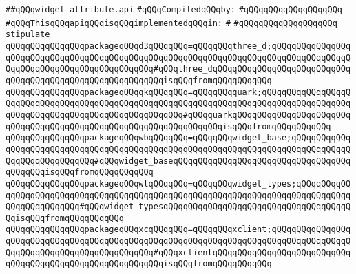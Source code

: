 \label{src/lib/x-kit/widget/lib/widget-attribute.api}
\verb|##qQQqwidget-attribute.api|\newline
\newline
\verb|#qQQqCompiledqQQqby:|\newline
\verb|#qQQqqQQqqQQqqQQqqQQq|\newline
\newline
\verb|#qQQqThisqQQqapiqQQqisqQQqimplementedqQQqin:|\newline
\verb|#|\newline
\verb|#qQQqqQQqqQQqqQQqqQQq|\newline
\newline
\verb|stipulate|\newline
\verb|qQQqqQQqqQQqqQQqpackageqQQqd3qQQqqQQq=qQQqqQQqthree_d;qQQqqQQqqQQqqQQqqQQqqQQqqQQqqQQqqQQqqQQqqQQqqQQqqQQqqQQqqQQqqQQqqQQqqQQqqQQqqQQqqQQqqQQqqQQqqQQqqQQqqQQqqQQqqQQqqQQq#qQQqthree_dqQQqqQQqqQQqqQQqqQQqqQQqqQQqqQQqqQQqqQQqqQQqqQQqqQQqqQQqqQQqisqQQqfromqQQqqQQqqQQq|\newline
\verb|qQQqqQQqqQQqqQQqpackageqQQqqkqQQqqQQq=qQQqqQQqquark;qQQqqQQqqQQqqQQqqQQqqQQqqQQqqQQqqQQqqQQqqQQqqQQqqQQqqQQqqQQqqQQqqQQqqQQqqQQqqQQqqQQqqQQqqQQqqQQqqQQqqQQqqQQqqQQqqQQqqQQqqQQq#qQQqquarkqQQqqQQqqQQqqQQqqQQqqQQqqQQqqQQqqQQqqQQqqQQqqQQqqQQqqQQqqQQqqQQqqQQqisqQQqfromqQQqqQQqqQQq|\newline
\verb|qQQqqQQqqQQqqQQqpackageqQQqwbqQQqqQQq=qQQqqQQqwidget_base;qQQqqQQqqQQqqQQqqQQqqQQqqQQqqQQqqQQqqQQqqQQqqQQqqQQqqQQqqQQqqQQqqQQqqQQqqQQqqQQqqQQqqQQqqQQqqQQqqQQq#qQQqwidget_baseqQQqqQQqqQQqqQQqqQQqqQQqqQQqqQQqqQQqqQQqqQQqisqQQqfromqQQqqQQqqQQq|\newline
\verb|qQQqqQQqqQQqqQQqpackageqQQqwtqQQqqQQq=qQQqqQQqwidget_types;qQQqqQQqqQQqqQQqqQQqqQQqqQQqqQQqqQQqqQQqqQQqqQQqqQQqqQQqqQQqqQQqqQQqqQQqqQQqqQQqqQQqqQQqqQQqqQQq#qQQqwidget_typesqQQqqQQqqQQqqQQqqQQqqQQqqQQqqQQqqQQqqQQqisqQQqfromqQQqqQQqqQQq|\newline
\verb|qQQqqQQqqQQqqQQqpackageqQQqxcqQQqqQQq=qQQqqQQqxclient;qQQqqQQqqQQqqQQqqQQqqQQqqQQqqQQqqQQqqQQqqQQqqQQqqQQqqQQqqQQqqQQqqQQqqQQqqQQqqQQqqQQqqQQqqQQqqQQqqQQqqQQqqQQqqQQqqQQq#qQQqxclientqQQqqQQqqQQqqQQqqQQqqQQqqQQqqQQqqQQqqQQqqQQqqQQqqQQqqQQqqQQqisqQQqfromqQQqqQQqqQQq|\newline
